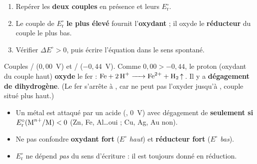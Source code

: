 \documentclass[11pt,a4paper]{article}
\begin{document}
\begin{methode}
\begin{enumerate}[label=\textbf{\arabic*.},leftmargin=2.0em,topsep=1pt,itemsep=1pt]
  \item Repérer les \textbf{deux couples} en présence et leurs $E_{\mathrm{r}}^{\circ}$.
  \item Le couple de $E_{\mathrm{r}}^{\circ}$ \textbf{le plus élevé} fournit l'\textbf{oxydant} ; il
        oxyde le \textbf{réducteur} du couple le plus bas.
  \item Vérifier $\Delta E^{\circ}>0$, puis écrire l'équation dans le sens spontané.
\end{enumerate}
\end{methode}

\begin{exemplebox}
Couples / ($0{,}00$~V) et / ($-0{,}44$~V). Comme $0{,}00>-0{,}44$,
le proton  (oxydant du couple haut) \textbf{oxyde} le fer : $\ce{Fe + 2 H+ -> Fe^{2+} + H2 ^}$.
Il y a \textbf{dégagement de dihydrogène}. (Le fer s'arrête à , car  ne peut pas
l'oxyder jusqu'à , couple situé plus haut.)
\end{exemplebox}

\begin{piege}
\begin{itemize}[leftmargin=1.5em,topsep=1pt,itemsep=0pt]
  \item Un métal  est attaqué par un acide (, $0$~V) avec dégagement de 
        \textbf{seulement si} $E_{\mathrm{r}}^{\circ}(\ce{M^{n+}}/\ce{M})<0$ (Zn, Fe, Al\ldots oui ;
        Cu, Ag, Au non).
  \item Ne pas confondre \textbf{oxydant fort} ($E^{\circ}$ \emph{haut}) et \textbf{réducteur fort}
        ($E^{\circ}$ \emph{bas}).
  \item $E_{\mathrm{r}}^{\circ}$ ne dépend \emph{pas} du sens d'écriture : il est toujours donné en
        réduction.
\end{itemize}
\end{piege}
\end{document}
